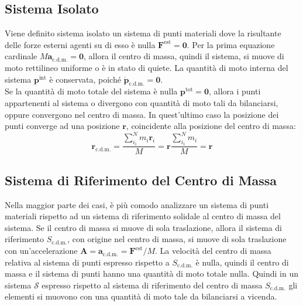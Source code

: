 \documentclass{article}
\newcommand{\vect}[1]{\boldsymbol{\mathbf{#1}}}
\numberwithin{equation}{subsection}
\begin{document}
\subsection{Sistema Isolato}
Viene definito sistema isolato un sistema di punti materiali dove la risultante delle 
forze esterni agenti su di esso è nulla $\vect{F}^\mathrm{est}=\vect{0}$. 
Per la prima equazione cardinale $M\vect{a}_{\mathrm{c.d.m.}}=\vect{0}$, allora il centro di massa, quindi il sistema, si muove di moto rettilineo 
uniforme o è in stato di quiete. La quantità di moto interna del sistema $\vect{p}^\mathrm{int}$ 
è conservata, poiché $\dot{\vect{p}}_{\mathrm{c.d.m.}}=\vect{0}$.
\\
Se la quantità di moto totale del sistema è nulla $\vect{p}^\mathrm{tot}=\vect{0}$, allora 
i punti appartenenti al sistema o divergono con quantità di 
moto tali da bilanciarsi, oppure convergono nel centro di 
massa. In quest'ultimo caso la posizione dei punti converge 
ad una posizione $\vect{r}$, coincidente alla posizione del centro di massa:
\begin{equation}
    \vect{r}_{\mathrm{c.d.m.}}=\displaystyle\frac{\sum_{i_1}^{N}m_i\vect{r}_i}{M}=\vect{r}\frac{\sum_{i_1}^{N}m_i}{M}=\vect{r}
\end{equation}

\subsection{Sistema di Riferimento del Centro di Massa}
Nella maggior parte dei casi, è più comodo analizzare un sistema di punti materiali rispetto ad un sistema di riferimento solidale al centro di massa del sistema. 
Se il centro di massa si muove di sola traslazione, allora
il sistema di riferimento $S_{\mathrm{c.d.m.}}$, con origine nel centro 
di massa, si muove di sola traslazione con un'accelerazione 
$\vect{A}=\vect{a}_{\mathrm{c.d.m.}}={\vect{F}^\mathrm{est}}/{M}$. 
La velocità del centro di massa relativa al sistema di punti espresso rispetto a $S_{\mathrm{c.d.m.}}$ è nulla, quindi il centro di massa e il sistema di punti hanno una quantità 
di moto totale nulla. Quindi in un sistema $\mathscr{S}$ espresso rispetto al sistema di riferimento del centro di massa $S_{\mathrm{c.d.m.}}$ gli elementi 
si muovono con una quantità di moto tale da bilanciarsi a vicenda. 
\end{document}
